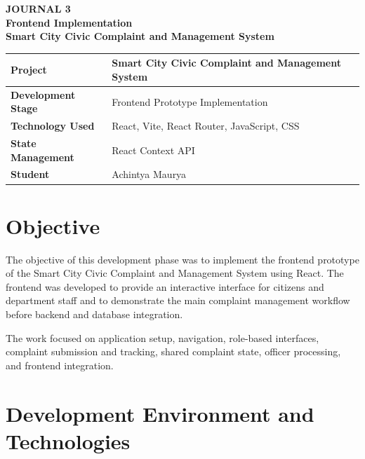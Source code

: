 \documentclass[12pt,a4paper]{article}
\begin{document}

\begin{center}
    {\Large \textbf{JOURNAL 3}}\\[8pt]
    {\large \textbf{Frontend Implementation}}\\[6pt]
    {\normalsize \textbf{Smart City Civic Complaint and Management System}}
\end{center}

\vspace{12pt}

\begin{tabular}{|p{}|p{}|}
\hline
\textbf{Project} &
Smart City Civic Complaint and Management System \\ \hline

\textbf{Development Stage} &
Frontend Prototype Implementation \\ \hline

\textbf{Technology Used} &
React, Vite, React Router, JavaScript, CSS \\ \hline

\textbf{State Management} &
React Context API \\ \hline


\textbf{Student} &
Achintya Maurya \\ \hline
\end{tabular}

\section{Objective}

The objective of this development phase was to implement the frontend
prototype of the Smart City Civic Complaint and Management System using
React. The frontend was developed to provide an interactive interface for
citizens and department staff and to demonstrate the main complaint
management workflow before backend and database integration.

The work focused on application setup, navigation, role-based interfaces,
complaint submission and tracking, shared complaint state, officer
processing, and frontend integration.

\section{Development Environment and Technologies}
\end{document}
